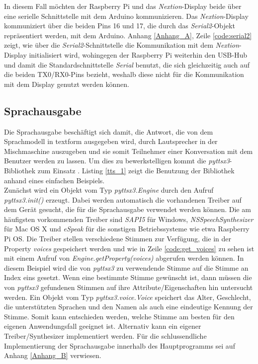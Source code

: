 \noindent
In diesem Fall möchten der Raspberry Pi und das \textit{Nextion}-Display beide über eine serielle Schnittstelle mit dem Arduino kommunizieren. Das \textit{Nextion}-Display kommuniziert über die beiden Pins 16 und 17, die durch das \textit{Serial2}-Objekt repräsentiert werden, mit dem Arduino. Anhang \ref{Anhang_A}, Zeile \ref{code:serial2} zeigt, wie über die \textit{Serial2}-Schnittstelle die Kommunikation mit dem \textit{Nextion}-Display initialisiert wird, wohingegen der Raspberry Pi weiterhin den USB-Hub und damit die Standardschnittstelle \textit{Serial} benutzt, die sich gleichzeitig auch auf die beiden TX0/RX0-Pins bezieht, weshalb diese nicht für die Kommunikation mit dem Display genutzt werden können.
\subsection{Sprachausgabe} 
Die Sprachausgabe beschäftigt sich damit, die Antwort, die von dem Sprachmodell in textform ausgegeben wird, durch Lautsprecher in der Mischmaschine auszugeben und sie somit Teilnehmer einer Konversation mit dem Benutzer werden zu lassen. Um dies zu bewerkstelligen kommt die \textit{pyttsx3}-Bibliothek zum Einsatz \cite{pyttsx3}. Listing \ref{tts_1} zeigt die Benutzung der Bibliothek anhand eines einfachen Beispiels.\\

Zunächst wird ein Objekt vom Typ \textit{pyttsx3.Engine} durch den Aufruf \textit{pyttsx3.init()} erzeugt. Dabei werden automatisch die vorhandenen Treiber auf dem Gerät gesucht, die für die Sprachausgabe verwendet werden können. Die am häufigsten vorkommenden Treiber sind \textit{SAPI5} für Windows, \textit{NSSpeechSynthesizer} für Mac OS X und \textit{eSpeak} für die sonstigen Betriebssysteme wie etwa Raspberry Pi OS. Die Treiber stellen verschiedene \glqq{}Stimmen\grqq{} zur Verfügung, die in der Property \textit{voices} gespeichert werden und wie in Zeile \ref{code:get_voices} zu sehen ist mit einem Aufruf von \textit{Engine.getProperty(\glqq{}voices\grqq{})} abgerufen werden können. In diesem Beispiel wird die von \textit{pyttsx3} zu verwendende Stimme auf die Stimme an Index eins gesetzt. Wenn eine bestimmte Stimme gewünscht ist, dann müssen die von \textit{pyttsx3} gefundenen Stimmen auf ihre Attribute/Eigenschaften hin untersucht werden. Ein Objekt vom Typ \textit{pyttsx3.voice.Voice} speichert das Alter, Geschlecht, die unterstützten Sprachen und den Namen als auch eine eindeutige Kennung der Stimme. Somit kann entschieden werden, welche Stimme am besten für den eigenen Anwendungsfall geeignet ist. Alternativ kann ein eigener Treiber/Synthesizer implementiert werden. Für die schlussendliche Implementierung der Sprachausgabe innerhalb des Hauptprogramms sei auf Anhang \ref{Anhang_B} verwiesen.
